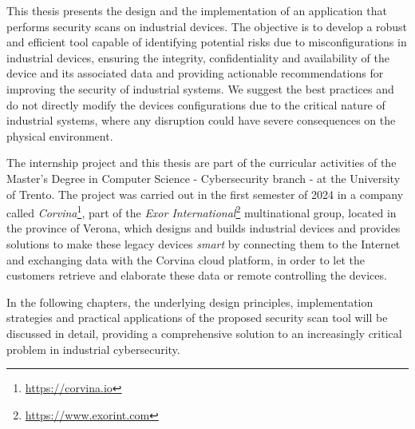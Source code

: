 This thesis presents the design and the implementation of an application that performs security scans on industrial devices. The objective is to develop a robust and efficient tool capable of identifying potential risks due to misconfigurations in industrial devices, ensuring the integrity, confidentiality and availability of the device and its associated data and providing actionable recommendations for improving the security of industrial systems. We suggest the best practices and do not directly modify the devices configurations due to the critical nature of industrial systems, where any disruption could have severe consequences on the physical environment.

The internship project and this thesis are part of the curricular activities of the Master's Degree in Computer Science - Cybersecurity branch - at the University of Trento. The project was carried out in the first semester of 2024 in a company called \textit{Corvina}\footnote{\url{https://corvina.io}}, part of the \textit{Exor International}\footnote{\url{https://www.exorint.com}} multinational group, located in the province of Verona, which designs and builds industrial devices and provides solutions to make these legacy devices \textit{smart} by connecting them to the Internet and exchanging data with the Corvina cloud platform, in order to let the customers retrieve and elaborate these data or remote controlling the devices.

In the following chapters, the underlying design principles, implementation strategies and practical applications of the proposed security scan tool will be discussed in detail, providing a comprehensive solution to an increasingly critical problem in industrial cybersecurity.
